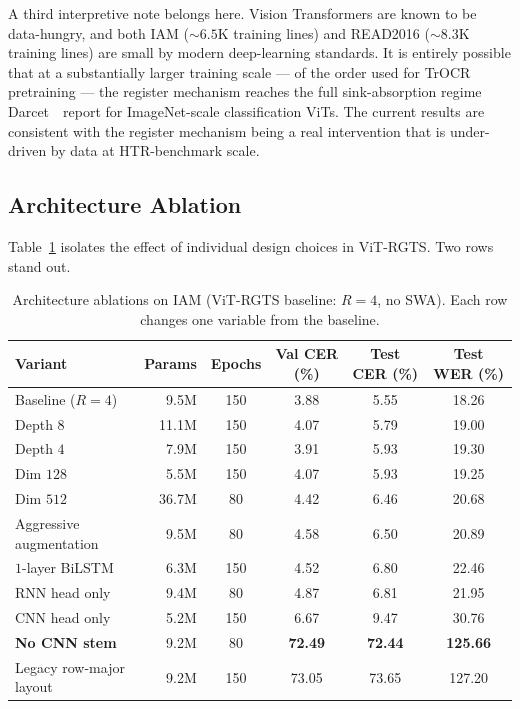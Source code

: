 A third interpretive note belongs here. Vision Transformers are known to be data-hungry, and both IAM ($\sim\!6.5$K training lines) and READ2016 ($\sim\!8.3$K training lines) are small by modern deep-learning standards. It is entirely possible that at a substantially larger training scale --- of the order used for TrOCR pretraining --- the register mechanism reaches the full sink-absorption regime Darcet~\etal\ report for ImageNet-scale classification ViTs. The current results are consistent with the register mechanism being a real intervention that is under-driven by data at HTR-benchmark scale.

\subsection{Architecture Ablation}
\label{sec:res_abl_arch}

Table~\ref{tab:ablations} isolates the effect of individual design choices in ViT-RGTS. Two rows stand out.

\begin{table}[h]
\centering
\footnotesize
\caption{Architecture ablations on IAM (ViT-RGTS baseline: $R = 4$, no SWA). Each row changes one variable from the baseline.}
\label{tab:ablations}
\begin{tabular}{lrcccc}
\toprule
Variant & Params & Epochs & Val CER (\%) & Test CER (\%) & Test WER (\%) \\
\midrule
Baseline ($R = 4$)      & 9.5M  & 150 & 3.88 & 5.55 & 18.26 \\
Depth $8$               & 11.1M & 150 & 4.07 & 5.79 & 19.00 \\
Depth $4$               & 7.9M  & 150 & 3.91 & 5.93 & 19.30 \\
Dim $128$               & 5.5M  & 150 & 4.07 & 5.93 & 19.25 \\
Dim $512$               & 36.7M & 80  & 4.42 & 6.46 & 20.68 \\
Aggressive augmentation & 9.5M  & 80  & 4.58 & 6.50 & 20.89 \\
$1$-layer BiLSTM        & 6.3M  & 150 & 4.52 & 6.80 & 22.46 \\
RNN head only           & 9.4M  & 80  & 4.87 & 6.81 & 21.95 \\
CNN head only           & 5.2M  & 150 & 6.67 & 9.47 & 30.76 \\
\textbf{No CNN stem}    & 9.2M  & 80  & \textbf{72.49} & \textbf{72.44} & \textbf{125.66} \\
Legacy row-major layout & 9.2M  & 150 & 73.05 & 73.65 & 127.20 \\
\bottomrule
\end{tabular}
\end{table}

